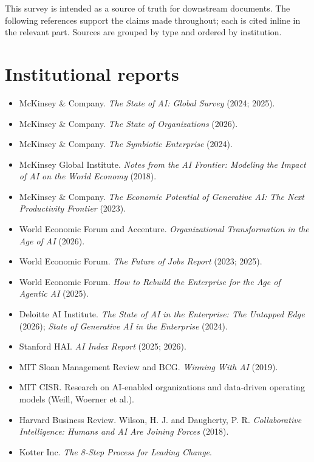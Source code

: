 
This survey is intended as a source of truth for downstream documents. The
following references support the claims made throughout; each is cited inline
in the relevant part. Sources are grouped by type and ordered by institution.

\section{Institutional reports}

\begin{itemize}
  \item McKinsey \& Company. \textit{The State of AI: Global Survey} (2024; 2025).
  \item McKinsey \& Company. \textit{The State of Organizations} (2026).
  \item McKinsey \& Company. \textit{The Symbiotic Enterprise} (2024).
  \item McKinsey Global Institute. \textit{Notes from the AI Frontier: Modeling
        the Impact of AI on the World Economy} (2018).
  \item McKinsey \& Company. \textit{The Economic Potential of Generative AI:
        The Next Productivity Frontier} (2023).
  \item World Economic Forum and Accenture. \textit{Organizational
        Transformation in the Age of AI} (2026).
  \item World Economic Forum. \textit{The Future of Jobs Report} (2023; 2025).
  \item World Economic Forum. \textit{How to Rebuild the Enterprise for the
        Age of Agentic AI} (2025).
  \item Deloitte AI Institute. \textit{The State of AI in the Enterprise: The
        Untapped Edge} (2026); \textit{State of Generative AI in the
        Enterprise} (2024).
  \item Stanford HAI. \textit{AI Index Report} (2025; 2026).
  \item MIT Sloan Management Review and BCG. \textit{Winning With AI} (2019).
  \item MIT CISR. Research on AI-enabled organizations and data-driven
        operating models (Weill, Woerner et al.).
  \item Harvard Business Review. Wilson, H. J. and Daugherty, P. R.
        \textit{Collaborative Intelligence: Humans and AI Are Joining Forces}
        (2018).
  \item Kotter Inc. \textit{The 8-Step Process for Leading Change}.
\end{itemize}

